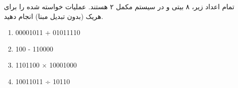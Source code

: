 تمام اعداد زیر، ۸ بیتی و در سیستم مکمل ۲ هستند. عملیات خواسته شده را برای هریک (بدون تبدیل مبنا) انجام دهید.

\begin{latin}
	\begin{enumerate}
		\item 
		00001011 + 01011110
		
		\item 
		100 - 110000
		
		\item 
		1101100 $\times$ 10001000
		
		\item 
		10011011 ÷ 10110
	\end{enumerate}
\end{latin}